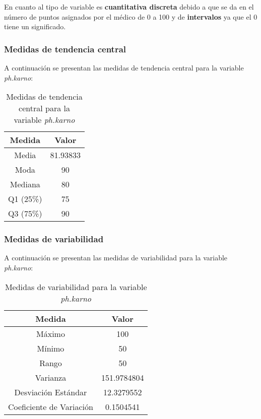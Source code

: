\documentclass[a4paper,12pt]{article}
\begin{document}
    En cuanto al tipo de variable es \textbf{cuantitativa discreta} debido a que se da en el número de puntos asignados por el médico de 0 a 100 y de \textbf{intervalos} ya que el 0 tiene un significado.

    \subsubsection*{Medidas de tendencia central}

A continuación se presentan las medidas de tendencia central para la variable \textit{ph.karno}:

\begin{table}[h!]
    \centering
    \begin{tabular}{|c|c|}
        \hline
        \textbf{Medida} & \textbf{Valor} \\
        \hline
        Media & 81.93833 \\
        \hline
        Moda & 90 \\
        \hline
        Mediana & 80 \\
        \hline
        Q1 (25\%) & 75 \\
        \hline
        Q3 (75\%) & 90 \\
        \hline
    \end{tabular}
    \caption{Medidas de tendencia central para la variable \textit{ph.karno}}
    \label{tab:medidas_tendencia_central_ph_karno}
\end{table}

\subsubsection*{Medidas de variabilidad}

A continuación se presentan las medidas de variabilidad para la variable \textit{ph.karno}:

\begin{table}[h!]
    \centering
    \begin{tabular}{|c|c|}
        \hline
        \textbf{Medida} & \textbf{Valor} \\
        \hline
        Máximo & 100 \\
        \hline
        Mínimo & 50 \\
        \hline
        Rango & 50 \\
        \hline
        Varianza & 151.9784804 \\
        \hline
        Desviación Estándar & 12.3279552 \\
        \hline
        Coeficiente de Variación & 0.1504541 \\
        \hline
    \end{tabular}
    \caption{Medidas de variabilidad para la variable \textit{ph.karno}}
    \label{tab:medidas_variabilidad_ph_karno}
\end{table}
\end{document}
